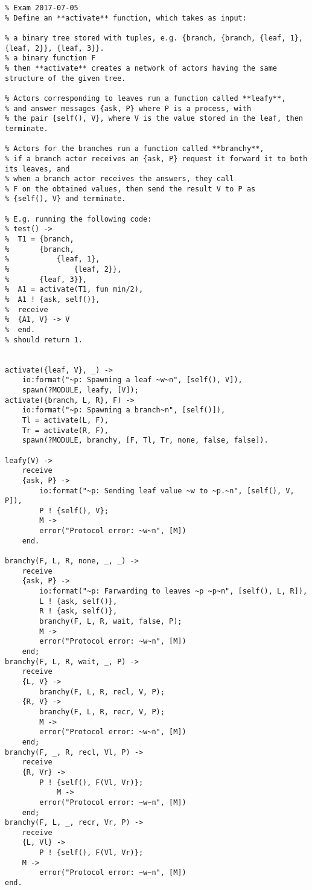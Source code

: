 \begin{lstlisting}
% Exam 2017-07-05
% Define an **activate** function, which takes as input:

% a binary tree stored with tuples, e.g. {branch, {branch, {leaf, 1}, {leaf, 2}}, {leaf, 3}}.
% a binary function F
% then **activate** creates a network of actors having the same structure of the given tree.

% Actors corresponding to leaves run a function called **leafy**,
% and answer messages {ask, P} where P is a process, with
% the pair {self(), V}, where V is the value stored in the leaf, then terminate.

% Actors for the branches run a function called **branchy**,
% if a branch actor receives an {ask, P} request it forward it to both its leaves, and
% when a branch actor receives the answers, they call
% F on the obtained values, then send the result V to P as
% {self(), V} and terminate.

% E.g. running the following code:
% test() ->
%  T1 = {branch,
%		{branch,
%			{leaf, 1},
%				{leaf, 2}},
%		{leaf, 3}},
%  A1 = activate(T1, fun min/2),
%  A1 ! {ask, self()},
%  receive
%  {A1, V} -> V
%  end.
% should return 1.


activate({leaf, V}, _) ->
    io:format("~p: Spawning a leaf ~w~n", [self(), V]),
    spawn(?MODULE, leafy, [V]);
activate({branch, L, R}, F) ->
    io:format("~p: Spawning a branch~n", [self()]),
    Tl = activate(L, F),
    Tr = activate(R, F),
    spawn(?MODULE, branchy, [F, Tl, Tr, none, false, false]).

leafy(V) ->
    receive
    {ask, P} ->
        io:format("~p: Sending leaf value ~w to ~p.~n", [self(), V, P]),
        P ! {self(), V};
        M ->
        error("Protocol error: ~w~n", [M])
    end.

branchy(F, L, R, none, _, _) ->
    receive
    {ask, P} ->
        io:format("~p: Farwarding to leaves ~p ~p~n", [self(), L, R]),
        L ! {ask, self()},
        R ! {ask, self()},
        branchy(F, L, R, wait, false, P);
        M ->
        error("Protocol error: ~w~n", [M])
    end;
branchy(F, L, R, wait, _, P) ->
    receive
    {L, V} ->
        branchy(F, L, R, recl, V, P);
    {R, V} ->
        branchy(F, L, R, recr, V, P);
        M ->
        error("Protocol error: ~w~n", [M])
    end;
branchy(F, _, R, recl, Vl, P) ->
    receive
    {R, Vr} ->
        P ! {self(), F(Vl, Vr)};
            M ->
        error("Protocol error: ~w~n", [M])
    end;
branchy(F, L, _, recr, Vr, P) ->
    receive
    {L, Vl} ->
        P ! {self(), F(Vl, Vr)};
    M ->
        error("Protocol error: ~w~n", [M])
end.


\end{lstlisting}
